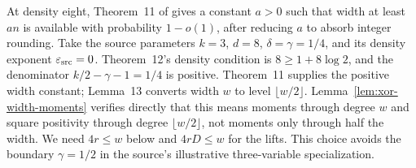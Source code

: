 At density eight, Theorem~11 of \citet{Schoenebeck2008} gives a constant
$a>0$ such that width at least $an$ is available with probability $1-o(1)$,
after reducing $a$ to absorb integer rounding. Take the source parameters
$k=3$, $d=8$, $\delta=\gamma=1/4$, and its density exponent
$\varepsilon_{\rm src}=0$. Theorem~12's density condition is
$8\ge1+8\log2$, and the denominator $k/2-\gamma-1=1/4$ is positive.
Theorem~11 supplies the positive width constant; Lemma~13 converts width
$w$ to level $\lfloor w/2\rfloor$. Lemma~\ref{lem:xor-width-moments}
verifies directly that this means moments through degree $w$ and square
positivity through degree $\lfloor w/2\rfloor$, not moments only through
half the width. We need $4r\le w$ below and $4rD\le w$ for the lifts.
This choice avoids the boundary $\gamma=1/2$ in the source's illustrative
three-variable specialization.

